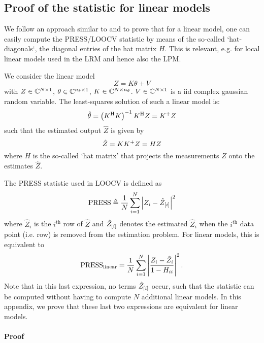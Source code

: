 \begin{subappendices}
  \section{Proof of the  statistic for linear models}

  We follow an approach similar to \citet{Hyndman2014LOOCV} and \citet[Section 12.3.2]{Seber2003} to prove that for a linear model, one can easily compute the \gls{PRESS}/\gls{LOOCV} statistic by means of the so-called `hat-diagonals`, the diagonal entries of the hat matrix $H$.
  This is relevant, e.g. for local linear models used in the \gls{LRM} and hence also the \gls{LPM}.

  We consider the linear model
  \begin{equation}
    Z = K \theta + V
  \end{equation}
  with $Z \in \ComplexMatrix{N\times1}$, $\theta \in \ComplexMatrix{\nth \times 1}$, $K \in \ComplexMatrix{N \times \nth}$.
$V \in \ComplexMatrix{N \times 1}$ is a \gls{iid} complex gaussian random variable.
The least-squares solution of such a linear model is:
\begin{equation}
  \hat{\theta} = \left(K^{\HT} K \right)^{-1} K^{\HT} Z = \pinv{K} Z
\end{equation}
such that the estimated output $\hat{Z}$ is given by
\begin{equation}
  \hat{Z} = K \pinv{K} Z = H Z
\end{equation}
where $H$ is the so-called `hat matrix' that projects the measurements $Z$ onto the estimates $\hat{Z}$.

The \gls{PRESS} statistic used in \gls{LOOCV} is defined as~\citep[Chapter 12]{Seber2003}
\begin{equation}
  \PRESS \isdef 
    \frac{1}{N} 
      \sum_{i=1}^{N}
      \abs{
        Z_i - \ignoring{i}{\hat{Z}}
      }^2
\end{equation}
where $\hat{Z}_i$ is the $i^{\text{th}}$ row of $\hat{Z}$ and $\ignoring{i}{\hat{Z}}$ denotes the estimated $\hat{Z}_i$ when the $i^{\text{th}}$ data point (i.e. row) is removed from the estimation problem.
For linear models, this is equivalent to
\begin{equation}
  \PRESS_{\mathrm{linear}} = 
     \frac{1}{N}
     \sum_{i=1}^{N}
     \abs{
       \frac{Z_i - \hat{Z}_i}
                {1 - H_{ii}}
     }^2
     \text{.}
\end{equation}
Note that in this last expression, no terms $\ignoring{i}{\hat{Z}}$ occur, such that the statistic can be computed without having to compute $N$ additional linear models.
In this appendix, we prove that these last two expressions are equivalent for linear models.

\paragraph{Proof}


\end{subappendices}

